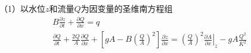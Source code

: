                                                         （1）以水位$z$和流量$Q$为因变量的圣维南方程组
                                                        \begin{equation}
                                                          \begin{gathered}
                                                            B\frac{\partial z}{\partial t}
                                                            +
                                                            \frac{\partial Q}{\partial x}
                                                            =
                                                            q
                                                            \\
                                                            \frac{\partial Q}{\partial t}
                                                            +
                                                            \frac{2Q}{A}\frac{\partial Q}{\partial x}
                                                            +
                                                            \left[
                                                              gA -
                                                              B
                                                              \left(
                                                                \frac{Q}{A}
                                                              \right)^{2}
                                                            \right]
                                                            \frac{\partial z}{\partial x}
                                                            =
                                                            \left(
                                                              \frac{Q}{A}
                                                            \right)^{2}
                                                            \left.
                                                              \frac{\partial A}{\partial x}
                                                              \right|_{z}
                                                              -
                                                              gA\frac{Q^{2}}{K^{2}}
                                                            \end{gathered}
                                                            \label{EqCGe_SV_zQ}
                                                          \end{equation}

